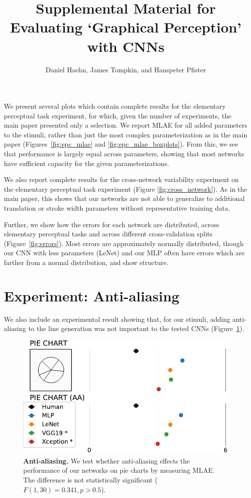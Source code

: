 \documentclass[journal]{vgtc}                %
\title{Supplemental Material for\\Evaluating `Graphical Perception' with CNNs}
\author{Daniel Haehn, James Tompkin, and Hanspeter Pfister}
\begin{document}
\maketitle

We present several plots which contain complete results for the elementary perceptual task experiment, for which, given the number of experiments, the main paper presented only a selection. We report MLAE for all added parameters to the stimuli, rather than just the most complex parameterization as in the main paper (Figures~\ref{fig:epc_mlae} and \ref{fig:epc_mlae_boxplots}). From this, we see that performance is largely equal across parameters, showing that most networks have sufficient capacity for the given parameterizations.

We also report complete results for the cross-network variability experiment on the elementary perceptual task experiment (Figure \ref{fig:cross_network}). As in the main paper, this shows that our networks are not able to generalize to additional translation or stroke width parameters without representative training data.

Further, we show how the errors for each network are distributed, across elementary perceptual tasks and across different cross-validation splits (Figure~\ref{fig:errors}). Most errors are approximately normally distributed, though our CNN with less parameters (LeNet) and our MLP often have errors which are farther from a normal distribution, and show structure.

\section{Experiment: Anti-aliasing}
We also include an experimental result showing that, for our stimuli, adding anti-aliasing to the line generation was not important to the tested CNNs (Figure~\ref{fig:aa}).

\begin{figure}[h]
\centering
\includegraphics[width=\linewidth]{../gfx/figure3_mlae_better_all_AA.pdf}
\caption{\textbf{Anti-aliasing.} We test whether anti-aliasing effects the performance of our networks on pie charts by measuring MLAE. The difference is not statistically significant ($F(1,30)=0.341,p>0.5$).}
\label{fig:aa}
\end{figure}
\vfill\null
\end{document}
